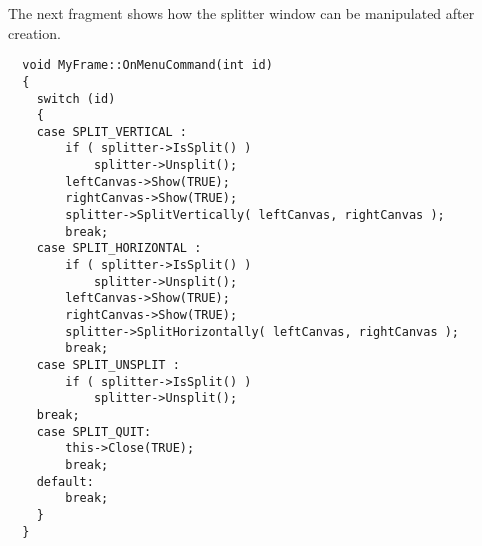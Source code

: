 The next fragment shows how the splitter window can be manipulated after creation.

{\small
\begin{verbatim}
  void MyFrame::OnMenuCommand(int id)
  {
    switch (id)
    {
    case SPLIT_VERTICAL :
        if ( splitter->IsSplit() )
            splitter->Unsplit();
        leftCanvas->Show(TRUE);
        rightCanvas->Show(TRUE);
        splitter->SplitVertically( leftCanvas, rightCanvas );
        break;
    case SPLIT_HORIZONTAL :
        if ( splitter->IsSplit() )
            splitter->Unsplit();
        leftCanvas->Show(TRUE);
        rightCanvas->Show(TRUE);
        splitter->SplitHorizontally( leftCanvas, rightCanvas );
        break;
    case SPLIT_UNSPLIT :
        if ( splitter->IsSplit() )
            splitter->Unsplit();
	break;
    case SPLIT_QUIT:
        this->Close(TRUE);
        break;
    default:
        break;
    }
  }
\end{verbatim}
}

